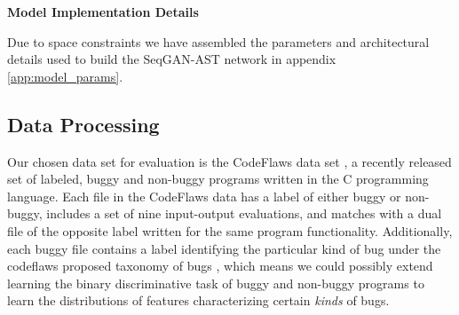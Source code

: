 \documentclass[sigconf]{acmart}
\begin{document}

\textbf{Model Implementation Details}

Due to space constraints we have assembled the parameters and architectural details used to build the SeqGAN-AST network in appendix \ref{app:model_params}. 


\subsection{Data Processing}
\label{sec:data_proc}
Our chosen data set for evaluation is the CodeFlaws data set \cite{tan2017codeflaws}, a recently released set of labeled, buggy and non-buggy programs written in the C programming language. Each file in the CodeFlaws data has a label of either buggy or non-buggy, includes a set of nine input-output evaluations, and matches with a dual file of the opposite label written for the same program functionality.  Additionally, each buggy file contains a label identifying the particular kind of bug under the codeflaws proposed taxonomy of bugs \cite{tan2017codeflaws}, which means we could possibly extend learning the binary discriminative task of buggy and non-buggy programs to learn the distributions of features characterizing certain \textit{kinds} of bugs.
\end{document}
